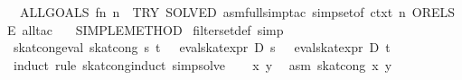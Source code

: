 \begin{isabellebody}
\ \ ALLGOALS\ {}fn\ n\ {}{}\ TRY\ {}SOLVED{}\ {}asm{}full{}simp{}tac\ {}simpset{}of\ ctxt{}{}\ n{}\ ORELSE\ all{}tac{}\isanewline
\ \ {}{}\ SIMPLE{}METHOD{}\isanewline
{}%
\endisatagML
{\isafoldML}%
%
\isadelimML
\isanewline
%
\endisadelimML
\isanewline
{}\isamarkupfalse%
\ filter{}set{}def\ {}simp{}\isanewline
\isanewline
{}\isamarkupfalse%
\ skat{}cong{}eval{}\ {}skat{}cong\ s\ t\ {}\ {}{}{}\ eval{}skat{}expr\ D\ s\ {}\ {}\ eval{}skat{}expr\ D\ t\ {}{}\isanewline
%
\isadelimproof
%
\endisadelimproof
%
\isatagproof
{}\isamarkupfalse%
\ {}induct\ rule{}\ skat{}cong{}induct{}\ simp{}solve{}\isanewline
\ \ \isamarkupfalse%
\ x\ y\ \isamarkupfalse%
\ asm{}{}\ {}skat{}cong\ x\ y{}\isanewline

\end{isabellebody}
